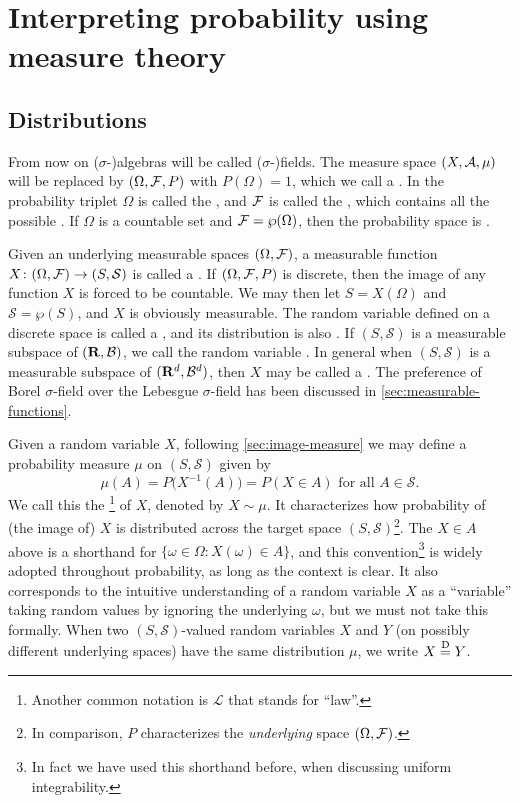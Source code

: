 \chapter{Interpreting probability using measure theory}
\section{Distributions} \label{sec:dist}
From now on ($\sigma$-)algebras will be called {($\sigma$-)fields}. The measure space $(X,\mathcal{A},\mu)$ will be replaced by $(\Omega,\mathcal{F},P)$ with $P(\Omega)=1$, which we call a . In the probability triplet $\Omega$ is called the , and $\mathcal{F}$ is called the , which contains all the possible . If $\Omega$ is a countable set and $\mathcal{F} = \wp(\Omega)$, then the probability space is .

Given an underlying measurable spaces $(\Omega,\mathcal{F})$, a measurable function $X\colon (\Omega,\mathcal{F}) \to (S,\mathcal{S})$ is called a . If $(\Omega,\mathcal{F},P)$ is discrete, then the image of any function $X$ is forced to be countable. We may then let $S = X(\Omega)$ and $\mathcal S = \wp(S)$, and $X$ is obviously measurable. The random variable defined on a discrete space is called a , and its distribution is also . If $(S,\mathcal S)$ is a measurable subspace of $(\mathbf{R},\mathcal{B})$, we call the random variable . In general when $(S,\mathcal S)$ is a measurable subspace of $(\mathbf{R}^d,\mathcal{B}^d)$, then $X$ may be called a . The preference of Borel $\sigma$-field over the Lebesgue $\sigma$-field has been discussed in \cref{sec:measurable-functions}.

Given a random variable $X$, following \cref{sec:image-measure} we may define a probability measure $\mu$ on $(S,\mathcal{S})$ given by \begin{equation} \label{eq:official-prob-dist-defn}
    \mu(A) = P\bigl(X^{-1}(A)\bigr) = P(X\in A) \text{ for all }A\in \mathcal{S}.
\end{equation}
We call this the \footnote{Another common notation is $\mathcal{L}$ that stands for ``law''.} of $X$, denoted by $X \sim \mu$. It characterizes how probability of (the image of) $X$ is distributed across the target space $(S,\mathcal S)$\footnote{In comparison, $P$ characterizes the \emph{underlying} space $(\Omega,\mathcal{F})$.}. The $X \in A$ above is a shorthand for $\{\omega\in \Omega:X(\omega)\in A\}$, and this convention\footnote{In fact we have used this shorthand before, when discussing uniform integrability.} is widely adopted throughout probability, as long as the context is clear. It also corresponds to the intuitive understanding of a random variable $X$ as a ``variable'' taking random values by ignoring the underlying $\omega$, but we must not take this formally. When two $(S,\mathcal{S})$-valued random variables $X$ and $Y$ (on possibly different underlying spaces) have the same distribution $\mu$, we write $X \stackrel{\mathrm{D}}{=} Y$.

